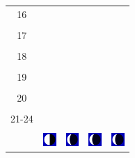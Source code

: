 \documentclass[twoside, a4paper,12pt, tikz]{scrartcl}
\begin{document}
\begin{tabularx}{\linewidth}{|c|X|X|p{2cm}|p{2cm}|}
            &   &       &    &   \\
          \hline
          16&   &                 &    &   \\
            &   &       &    &   \\
          \hline
          17&   &                 &    &   \\
            &   &       &    &   \\
          \hline
          18&   &                 &    &   \\
            &   &       &    &   \\
          \hline
          19&   &                 &     &   \\
            &   &       &    &   \\
          \hline
          20&   &              &    &   \\
            &   &       &    &   \\
          \hline 
          21-24&   &              &    &   \\
            &   &       &    &   \\
          \hline
                      & \vspace{0.01cm} \centerline{\includegraphics[width=0.5cm]{moon_phases/Moon_phase_6.svg.png}} \vspace{0.1cm} & \vspace{0.01cm} \centerline{\includegraphics[width=0.5cm]{moon_phases/Moon_phase_7.svg.png}} \vspace{0.1cm} & \vspace{0.01cm} \centerline{\includegraphics[width=0.5cm]{moon_phases/Moon_phase_7.svg.png}} \vspace{0.1cm} & \vspace{0.01cm} \centerline{\includegraphics[width=0.5cm]{moon_phases/Moon_phase_7.svg.png}} \vspace{0.1cm}\\
          \hline    
        \end{tabularx}
\end{document}
